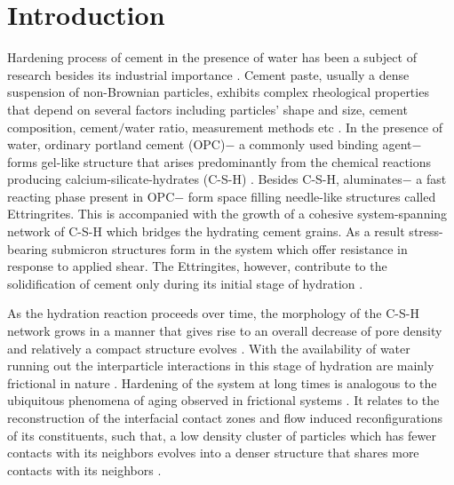 \documentclass[final,5p,twocolumn]{elsarticle}
\begin{document}
	\section{Introduction}
	\label{Introduction}
	Hardening process of cement in the presence of water has been a subject of research besides its industrial importance \cite{roussel_understanding_2012}. Cement paste, usually a dense suspension of non-Brownian particles, exhibits complex rheological properties that depend on several factors including particles' shape and size, cement composition, cement$/$water ratio, measurement methods etc \cite{larson_structure_1999, lapasin_1979, lootens_2004}. In the presence of water, ordinary portland cement (OPC)$-$ a commonly used binding agent$-$ forms gel-like structure that arises predominantly from the chemical reactions producing calcium-silicate-hydrates (C-S-H) \cite{yammine_2008, schmidt_rheological_2002, h_f_w_taylor_cement_1997}. Besides C-S-H, aluminates$-$ a fast reacting phase present in OPC$-$ form space filling needle-like structures called Ettringrites. This is accompanied with the growth of a  cohesive system-spanning network of C-S-H which bridges the hydrating cement grains. As a result  stress-bearing submicron structures form in the system which offer   resistance in response to applied  shear. The Ettringites, however, contribute to the  solidification  of cement only during its initial stage of hydration \cite{roussel_understanding_2012}.
	
	As the hydration reaction proceeds over time, the  morphology of the C-S-H network grows in a manner that gives rise to an overall decrease of pore density and relatively a compact structure evolves \cite{lootens_2004, beaudoin_1994}. With the availability of water running out the interparticle interactions  in this stage of hydration are mainly  frictional in nature \cite{yammine_2008, gallucci_2013}. Hardening of the system at long times is analogous to the ubiquitous phenomena of aging observed in frictional systems \cite{ruina_slip_1983}. It relates to the reconstruction of the interfacial contact zones \cite{ruina_slip_1983, li_frictional_2011} and flow induced reconfigurations of its constituents, such that, a low density cluster of particles which has fewer contacts with its neighbors evolves into a denser structure that shares more contacts with its neighbors \cite{brown_shear_2014, bai_adiabatic_1992, langer_shear-transformation-zone_2008}. 
	
\end{document}
